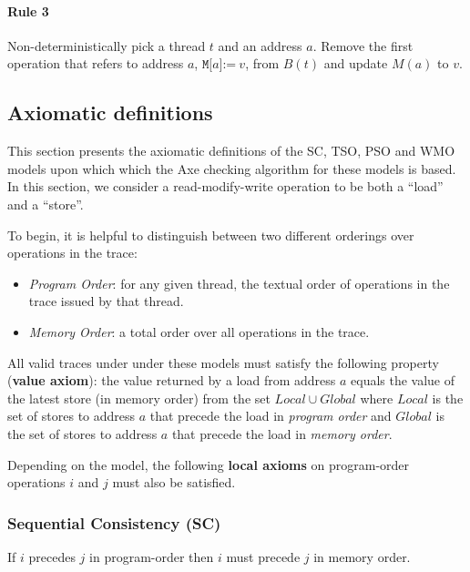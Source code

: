 \documentclass[11pt]{article}
\begin{document}
\paragraph{Rule 3}

Non-deterministically pick a thread $t$ and an address $a$.  Remove
the first operation that refers to address $a$,
$\texttt{M[}a\texttt{]:=}~v$, from $B(t)$ and update $M(a)$ to $v$.

\subsection{Axiomatic definitions}

This section presents the axiomatic definitions of the SC, TSO, PSO and
WMO models upon which which the Axe checking algorithm for these
models is based.  In this section, we consider a read-modify-write
operation to be both a ``load'' and a ``store''.

To begin, it is helpful to distinguish between two different orderings
over operations in the trace:

\begin{itemize}

\item
\emph{Program Order}: for any given thread, the textual order of
operations in the trace issued by that thread.

\item
\emph{Memory Order}: a total order over all operations in the trace.

\end{itemize}

All valid traces under under these models must satisfy the following
property (\textbf{value axiom}): the value returned by a load from
address $a$ equals the value of the latest store (in memory
order) from the set $Local \cup Global$ where $Local$ is the set of
stores to address $a$ that precede the load in \emph{program order}
and $Global$ is the set of stores to address $a$ that precede the load
in \emph{memory order}.

Depending on the model, the following \textbf{local axioms} on
program-order operations $i$ and $j$ must also be satisfied.

\subsubsection*{Sequential Consistency (SC)}

If $i$ precedes $j$ in program-order then $i$ must precede
$j$ in memory order.
\end{document}
